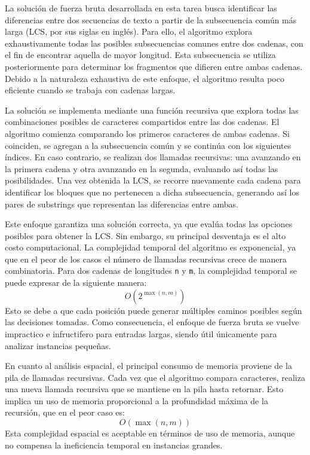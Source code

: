 La solución de fuerza bruta desarrollada en esta tarea \cite{GfG2025LCS} \cite{Programiz2025LCS} busca identificar las diferencias entre dos secuencias de texto a partir de la subsecuencia común más larga (LCS, por sus siglas en inglés). Para ello, el algoritmo explora exhaustivamente todas las posibles subsecuencias comunes entre dos cadenas, con el fin de encontrar aquella de mayor longitud. Esta subsecuencia se utiliza posteriormente para determinar los fragmentos que difieren entre ambas cadenas. Debido a la naturaleza exhaustiva de este enfoque, el algoritmo resulta poco eficiente cuando se trabaja con cadenas largas.

\vspace{0.5 cm}

La solución se implementa mediante una función recursiva que explora todas las combinaciones posibles de caracteres compartidos entre las dos cadenas. El algoritmo comienza comparando los primeros caracteres de ambas cadenas. Si coinciden, se agregan a la subsecuencia común y se continúa con los siguientes índices. En caso contrario, se realizan dos llamadas recursivas: una avanzando en la primera cadena y otra avanzando en la segunda, evaluando así todas las posibilidades. Una vez obtenida la LCS, se recorre nuevamente cada cadena para identificar los bloques que no pertenecen a dicha subsecuencia, generando así los pares de substrings que representan las diferencias entre ambas.

\vspace{0.5 cm}

Este enfoque garantiza una solución correcta, ya que evalúa todas las opciones posibles para obtener la LCS. Sin embargo, su principal desventaja es el alto costo computacional. La complejidad temporal del algoritmo es exponencial, ya que en el peor de los casos el número de llamadas recursivas crece de manera combinatoria. Para dos cadenas de longitudes \texttt{n} y \texttt{m}, la complejidad temporal se puede expresar de la siguiente manera: \[O(2^{\max(n, m)})\] Esto se debe a que cada posición puede generar múltiples caminos posibles según las decisiones tomadas. Como consecuencia, el enfoque de fuerza bruta se vuelve impractico e infructifero para entradas largas, siendo útil únicamente para analizar instancias pequeñas.

\vspace{0.5 cm}

En cuanto al análisis espacial, el principal consumo de memoria proviene de la pila de llamadas recursivas. Cada vez que el algoritmo compara caracteres, realiza una nueva llamada recursiva que se mantiene en la pila hasta retornar. Esto implica un uso de memoria proporcional a la profundidad máxima de la recursión, que en el peor caso es: \[O({\max(n, m)})\] Esta complejidad espacial es aceptable en términos de uso de memoria, aunque no compensa la ineficiencia temporal en instancias grandes.

